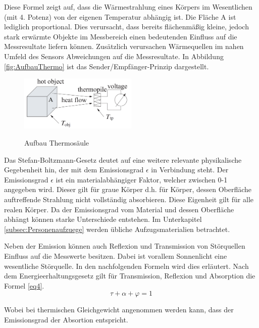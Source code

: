 Diese Formel zeigt auf, dass die Wärmestrahlung eines Körpers im Wesentlichen (mit 4. Potenz) von der eigenen Temperatur abhängig ist. Die Fläche A ist lediglich proportional. Dies verursacht, dass bereits flächenmäßig kleine, jedoch stark erwärmte Objekte im Messbereich einen bedeutenden Einfluss auf die Messresultate liefern können. Zusätzlich verursachen Wärmequellen im nahen Umfeld des Sensors Abweichungen auf die Messresultate. In Abbildung \ref{fig:AufbauThermo} ist das Sender/Empfänger-Prinzip dargestellt.

\begin{figure}[H]
	\centering
	\includegraphics[width=0.5\textwidth]
	{fig/seebeck2.PNG}
	\caption[Aufbau Thermosäule]{Aufbau Thermosäule} \protect\cite{seebeck}
	\label{fig:thermosäule}
\end{figure}


Das Stefan-Boltzmann-Gesetz deutet auf eine weitere relevante physikalische Gegebenheit hin, der mit dem Emissionsgrad $\epsilon$  in Verbindung steht. Der Emissionsgrad $\epsilon$ ist ein materialabhängiger Faktor, welcher zwischen 0-1  angegeben wird. Dieser gilt für graue Körper d.h. für Körper, dessen Oberfläche auftreffende Strahlung nicht vollständig absorbieren. Diese Eigenheit gilt für alle realen Körper. Da der Emissionsgrad vom Material und dessen Oberfläche abhängt können starke Unterschiede entstehen. Im Unterkapitel \ref{subsec:Personenaufzuege} werden übliche Aufzugsmaterialien betrachtet.

Neben der Emission können auch Reflexion und Transmission von Störquellen Einfluss auf die Messwerte besitzen. Dabei ist vorallem Sonnenlicht eine wesentliche Störquelle. In den nachfolgenden Formeln wird dies erläutert. Nach dem Energieerhaltungsgesetz \protect\cite{Thermoformeln} gilt für Transmission, Reflexion und Absorption die Formel \ref{eq4}.
\begin{equation}
\label{eq4}
\tau  + \alpha + \varphi  = 1
\end{equation}

Wobei bei thermischen Gleichgewicht angenommen werden kann, dass der Emissionsgrad der Absortion entspricht.

